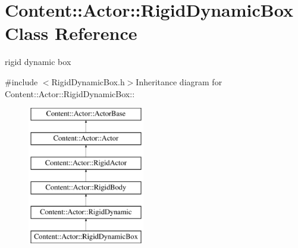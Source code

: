 \hypertarget{classContent_1_1Actor_1_1RigidDynamicBox}{
\section{Content::Actor::RigidDynamicBox Class Reference}
\label{classContent_1_1Actor_1_1RigidDynamicBox}
}


rigid dynamic box  


{\ttfamily \#include $<$RigidDynamicBox.h$>$}Inheritance diagram for Content::Actor::RigidDynamicBox::\begin{figure}[H]
\begin{center}
\leavevmode
\includegraphics[height=6cm]{classContent_1_1Actor_1_1RigidDynamicBox}
\end{center}
\end{figure}
